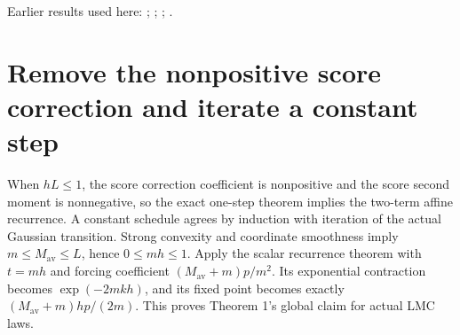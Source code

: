 \documentclass[11pt,a4paper]{article}
\begin{document}
Earlier results used here: \cite[Section~3.17.3]{LangevinLean2026ULASC}; \cite[Section~3.26.3]{LangevinLean2026ULASC}; \cite[Section~3.36.7]{LangevinLean2026ULASC}; \cite[Section~3.45.6]{LangevinLean2026ULASC}.

\section{\texorpdfstring{Remove the nonpositive score correction and iterate a constant step}{Remove the nonpositive score correction and iterate a constant step}}


When \(hL\le1\), the score correction coefficient is nonpositive and the score second moment is nonnegative, so the exact one-step theorem implies the two-term affine recurrence. A constant schedule agrees by induction with iteration of the actual Gaussian transition. Strong convexity and coordinate smoothness imply \(m\le M_{\mathrm{av}}\le L\), hence \(0\le mh\le 1\). Apply the scalar recurrence theorem with \(t=mh\) and forcing coefficient \((M_{\mathrm{av}}+m)p/m^2\). Its exponential contraction becomes \(\exp(-2mkh)\), and its fixed point becomes exactly \((M_{\mathrm{av}}+m)hp/(2m)\). This proves Theorem 1’s global claim for actual LMC laws.
\end{document}
